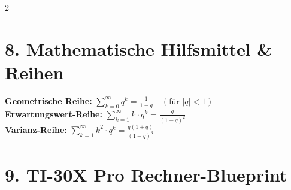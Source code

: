 \documentclass[a4paper, 9pt]{extarticle}
\begin{document}
\begin{multicols*}{2}
\section*{8. Mathematische Hilfsmittel \& Reihen}

\begin{tcolorbox}[title={Reihenentwicklungen für unendliche Räume}, colframe=mathgray, colback=mathgray!5, colbacktitle=mathgray]
\textbf{Geometrische Reihe:} $\sum_{k=0}^{\infty} q^k = \frac{1}{1-q} \quad (\text{für } |q| < 1)$\\
\textbf{Erwartungswert-Reihe:} $\sum_{k=1}^{\infty} k \cdot q^k = \frac{q}{(1-q)^2}$\\
\textbf{Varianz-Reihe:} $\sum_{k=1}^{\infty} k^2 \cdot q^k = \frac{q(1+q)}{(1-q)^3}$
\end{tcolorbox}

\section*{9. TI-30X Pro Rechner-Blueprint}


\end{multicols*}
\end{document}
